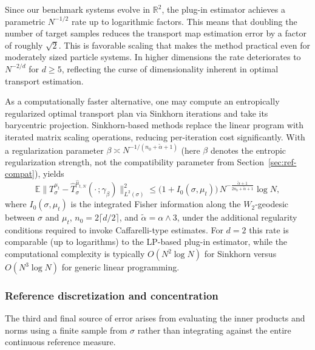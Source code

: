 \documentclass[11pt]{article}
\newcommand{\1}{\mathbf{1}}
\begin{document}
\begin{remark}\label{rmk:d2-rate}
Since our benchmark systems evolve in $\mathbb R^2$, the plug-in estimator achieves a parametric $N^{-1/2}$ rate up to logarithmic factors. This means that doubling the number of target samples reduces the transport map estimation error by a factor of roughly $\sqrt{2}$. This is favorable scaling that makes the method practical even for moderately sized particle systems. In higher
dimensions the rate deteriorates to $N^{-2/d}$ for $d\ge 5$, reflecting the curse of dimensionality inherent in optimal transport estimation. \\
\end{remark}

\begin{remark}\label{rmk:entropic}
As a computationally faster alternative, one may compute an entropically regularized optimal transport plan via Sinkhorn iterations and take its barycentric projection. Sinkhorn-based methods replace the linear program with iterated matrix scaling operations, reducing per-iteration cost significantly. With a regularization parameter $\beta \asymp N^{-1/(n_0+\tilde{\alpha}+1)}$ (here $\beta$ denotes the entropic regularization strength, not the compatibility parameter from Section~\ref{sec:ref-compat}), \cite[Theorem~3]{pooladian2021} yields
\[
  \mathbb{E}\bigl\|T_\sigma^{\mu_t}
  - \hat{T}_\sigma^{\hat{\mu}_{t,N}}(\cdot\,;\gamma_\beta)
  \bigr\|_{L^2(\sigma)}^2
  \leq \bigl(1 + I_0(\sigma, \mu_t)\bigr)
       \, N^{-\frac{\tilde{\alpha}+1}{2n_0 + \tilde{\alpha} + 1}} \log N,
\]
where $I_0(\sigma, \mu_t)$ is the integrated Fisher information along the $W_2$-geodesic between $\sigma$ and $\mu_t$,
$n_0 = 2\lceil d/2 \rceil$, and $\tilde{\alpha} = \alpha \wedge 3$, under the additional regularity conditions required to invoke Caffarelli-type estimates. For $d=2$ this rate is comparable (up to logarithms) to the LP-based plug-in estimator, while the computational complexity is typically $O(N^2\log N)$ for Sinkhorn versus $O(N^3\log N)$ for generic linear programming.
\end{remark}



\subsubsection{Reference discretization and concentration}

The third and final source of error arises from evaluating the inner products and norms using a finite sample from $\sigma$ rather than integrating against the entire continuous reference measure. 
\end{document}
